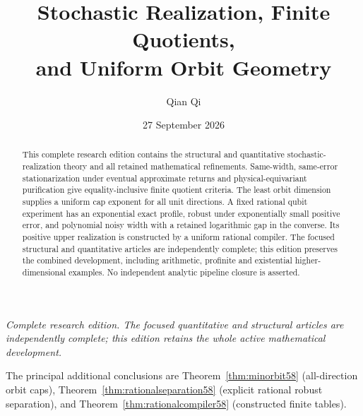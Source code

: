 \documentclass[11pt]{amsart}
\title[Stochastic realization and orbit geometry]{Stochastic Realization, Finite Quotients,\\and Uniform Orbit Geometry}
\author{Qian Qi}
\date{27 September 2026}
\numberwithin{equation}{section}
\theoremstyle{definition}\newtheorem{definition}[theorem]{Definition}
\theoremstyle{remark}\newtheorem{remark}[theorem]{Remark}
\begin{document}
\begin{abstract}
This complete research edition contains the structural and quantitative
stochastic-realization theory and all retained mathematical refinements.
Same-width, same-error stationarization under eventual approximate returns
and physical-equivariant purification give equality-inclusive finite
quotient criteria. The least orbit dimension supplies a uniform cap
exponent for all unit directions. A fixed rational qubit experiment has
an exponential exact profile, robust under exponentially small positive
error, and polynomial noisy width with a retained logarithmic gap in the
converse. Its positive upper realization is constructed by a uniform
rational compiler. The focused structural and quantitative articles are
independently complete; this edition preserves the combined development,
including arithmetic, profinite and existential higher-dimensional
examples. No independent analytic pipeline closure is asserted.
\end{abstract}
\maketitle
\noindent\textit{Complete research edition. The focused quantitative and structural articles are independently complete; this edition retains the whole active mathematical development.}

\noindent The principal additional conclusions are
Theorem~\ref{thm:minorbit58} (all-direction orbit caps),
Theorem~\ref{thm:rationalseparation58} (explicit rational robust separation),
and Theorem~\ref{thm:rationalcompiler58} (constructed finite tables).






















\appendix


\end{document}
